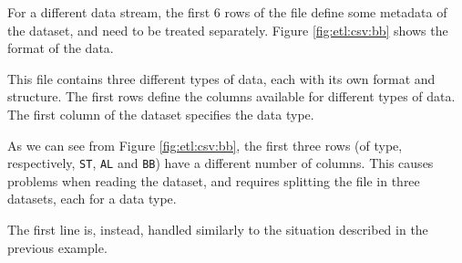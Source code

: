     For a different data stream, the first 6 rows of the file define some metadata of the dataset, and need to be treated separately.
    Figure \ref{fig:etl:csv:bb} shows the format of the data.
    
    This file contains three different types of data, each with its own format and structure.
    The first rows define the columns available for different types of data.
    The first column of the dataset specifies the data type.
    
    As we can see from Figure \ref{fig:etl:csv:bb}, the first three rows (of type, respectively, \texttt{ST}, \texttt{AL} and \texttt{BB}) have a different number of columns.
    This causes problems when reading the dataset, and requires splitting the file in three datasets, each for a data type.
    
    The first line is, instead, handled similarly to the situation described in the previous example.